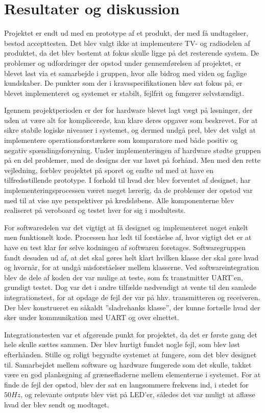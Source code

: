 \section{Resultater og diskussion}
Projektet er endt ud med en prototype af et produkt, der med få undtagelser, bestod accepttesten. Det blev valgt ikke at implementere TV- og radiodelen af produktet, da det blev bestemt at fokus skulle ligge på det resterende system. De problemer og udfordringer der opstod under gennemførelsen af projektet, er blevet løst via et samarbejde i gruppen, hvor alle bidrog med viden og faglige kundskaber. De punkter som der i kravsspecifikationen blev sat fokus på, er blevet implementeret og systemet er stabilt, fejlfrit og fungerer selvstændigt.

Igennem projektperioden er der for hardware blevet lagt vægt på løsninger, der uden at være alt for komplicerede, kan klare deres opgaver som beskrevet. For at sikre stabile logiske niveauer i systemet, og dermed undgå prel, blev det valgt at implementere operationsforstærkere som komparatore med både positiv og negativ spændingsforsyning. Under implementeringen af hardware stødte gruppen på en del problemer, med de designs der var lavet på forhånd. Men med den rette vejledning, forblev projektet på sporet og endte ud med at have en tilfredsstillende prototype. I forhold til hvad der blev forventet af designet, har implementeringsprocessen været meget lærerig, da de problemer der opstod var med til at vise nye perspektiver på kredsløbene. Alle komponenterne blev realiseret på veroboard og testet hver for sig i modultests.

For softwaredelen var det vigtigt at få designet og implementeret noget enkelt men funktionelt kode. Processen har ledt til forståelse af, hvor vigtigt det er at have en test klar før selve kodningen af softwaren foretages. Softwaregruppen fandt desuden ud af, at det skal gøres helt klart hvilken klasse der skal gøre hvad og hvornår, for at undgå misforståelser mellem klasserne. Ved softwareintegration blev de dele af koden der var mulige at teste, som fx transtmitter UART'en, grundigt testet. Dog var det i andre tilfælde nødvendigt at vente til den samlede integrationstest, for at opdage de fejl der var på hhv. transmitteren og receiveren. 
Der blev konstrueret en såkaldt ”sladrehanks klasse”, der kunne fortælle hvad der sker under kommunikation med UART og over elnettet.

Integrationstesten var et afgørende punkt for projektet, da det er første gang det hele skulle sættes sammen. Der blev hurtigt fundet nogle fejl, som blev løst efterhånden. Stille og roligt begyndte systemet at fungere, som det blev designet til. Samarbejdet mellem software og hardware fungerede som det skulle, takket være en god planlægning af grænsefladerne mellem elementerne i systemet. For at finde de fejl der opstod, blev der sat en langsommere frekvens ind, i stedet for $50Hz$, og relevante outputs blev vist på LED’er, således det var muligt at aflæse hvad der blev sendt og modtaget. 

